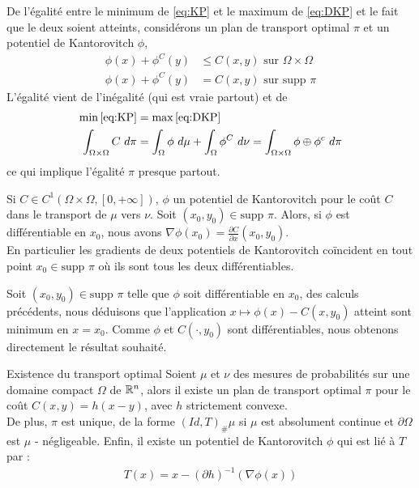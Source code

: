 \documentclass[a4paper,12pt]{article}
\newcommand{\supp}{\text{supp }}
\begin{document}
De l'égalité entre le minimum de \eqref{eq:KP} et le maximum de \eqref{eq:DKP} et le fait que le deux soient atteints, considérons un plan de transport optimal $\pi$ et un potentiel de Kantorovitch $\phi$, 
\begin{align}
\phi(x)+\phi^C(y) &\leq C(x,y) \text{ sur } \Omega\times\Omega \\
\phi(x)+\phi^C(y) &= C(x,y) \text{ sur }\supp\pi
\end{align}
L'égalité vient de l'inégalité (qui est vraie partout) et de 
\begin{align}
\min\eqref{eq:KP} &= \max \eqref{eq:DKP}\nonumber\\
\int_{\Omega\times\Omega} C\ d\pi &= \int_{\Omega}\phi\ d\mu +  \int_{\Omega} \phi^C\ d\nu = \int_{\Omega\times\Omega} \phi\oplus\phi^c\ d\pi
\end{align}
ce qui implique l'égalité $\pi$ presque partout. 

\begin{proposition}
Si $C\in C^1(\Omega\times\Omega,[0,+\infty])$, $\phi$ un potentiel de Kantorovitch pour le coût $C$ dans le transport de $\mu$ vers $\nu$. Soit $(x_0,y_0)\in\supp\pi$. Alors, si $\phi$ est différentiable en $x_0$, nous avons $\nabla\phi(x_0)= \frac{\partial C}{\partial x}(x_0,y_0)$.\\
En particulier les gradients de deux potentiels de Kantorovitch coïncident en tout point $x_0\in\supp\pi$ où ils sont tous les deux différentiables.
\end{proposition}
\begin{preuve}
Soit $(x_0,y_0)\in\supp\pi$ telle que $\phi$ soit différentiable en $x_0$, des calculs précédents, nous déduisons que l'application $x\mapsto\phi(x)-C(x,y_0)$ atteint sont minimum en $x=x_0$. 
Comme $\phi$ et $C(\cdot,y_0)$ sont différentiables, nous obtenons directement le résultat souhaité. 
\end{preuve}


\begin{theoreme}{Existence du transport optimal}
\label{thm:existtrasp}
Soient $\mu$ et $\nu$ des mesures de probabilités sur une domaine compact $\Omega$ de $\mathbb{R}^n$, alors il existe un plan de transport optimal $\pi$ pour le coût $C(x,y) = h(x-y)$, avec $h$ strictement convexe. \\
De plus, $\pi$ est unique, de la forme $(Id,T)_{\#}\mu$ si $\mu$ est absolument continue et $\partial\Omega$ est $\mu$ - négligeable. Enfin, il existe un potentiel de Kantorovitch $\phi$ qui est lié à $T$ par :
\begin{align}
T(x) = x- (\partial h)^{-1}(\nabla\phi(x))
\end{align}
\end{theoreme}
\end{document}
